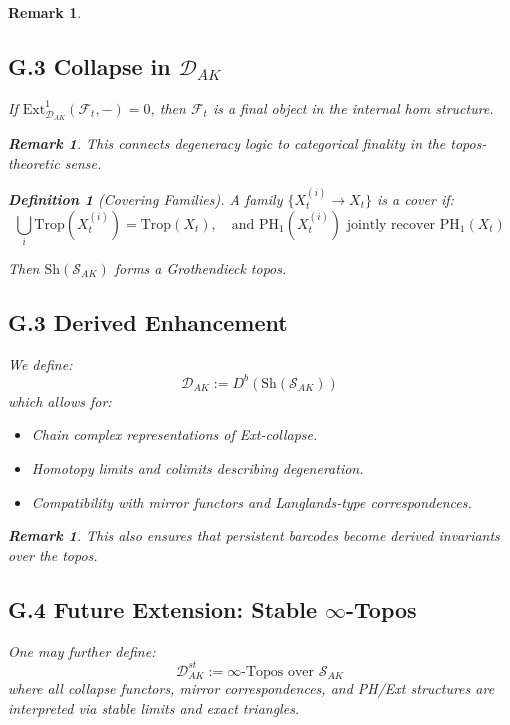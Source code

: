 \documentclass[11pt]{article}
\newtheorem{definition}[theorem]{Definition}
\newtheorem{remark}[theorem]{Remark}
\begin{document}
\begin{remark}
\subsection*{G.3 Collapse in $\mathcal{D}_{AK}$}

\begin{proposition}
If $\mathrm{Ext}^1_{\mathcal{D}_{AK}}(\mathcal{F}_t, -) = 0$, then $\mathcal{F}_t$ is a final object in the internal hom structure.
\end{proposition}

\begin{remark}
This connects degeneracy logic to categorical finality in the topos-theoretic sense.
\end{remark}

\begin{definition}[Covering Families]
A family \( \{X_t^{(i)} \to X_t\} \) is a cover if:
\[
\bigcup_i \mathrm{Trop}(X_t^{(i)}) = \mathrm{Trop}(X_t), \quad \text{and } \mathrm{PH}_1(X_t^{(i)}) \text{ jointly recover } \mathrm{PH}_1(X_t)
\]
\end{definition}

Then \( \mathrm{Sh}(\mathcal{S}_{AK}) \) forms a Grothendieck topos.

\subsection*{G.3 Derived Enhancement}

We define:
\[
\mathcal{D}_{AK} := D^b(\mathrm{Sh}(\mathcal{S}_{AK}))
\]
which allows for:
\begin{itemize}
  \item Chain complex representations of Ext-collapse.
  \item Homotopy limits and colimits describing degeneration.
  \item Compatibility with mirror functors and Langlands-type correspondences.
\end{itemize}

\begin{remark}
This also ensures that persistent barcodes become derived invariants over the topos.
\end{remark}

\subsection*{G.4 Future Extension: Stable $\infty$-Topos}

One may further define:
\[
\mathcal{D}^{st}_{AK} := \infty\text{-Topos over } \mathcal{S}_{AK}
\]
where all collapse functors, mirror correspondences, and PH/Ext structures are interpreted via stable limits and exact triangles.


\end{remark}
\end{document}
